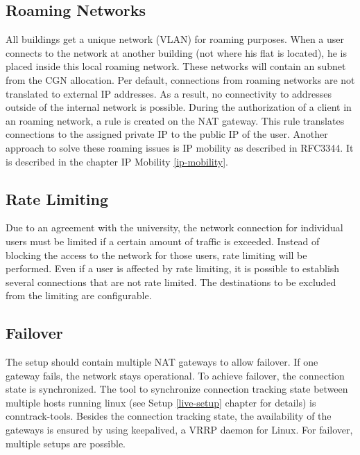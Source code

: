 \documentclass{report}
\begin{document}
\subsection{Roaming Networks}\label{roaming-networks}

All buildings get a unique network (VLAN) for roaming purposes. When a user connects to the network
at another building (not where his flat is located), he is placed inside
this local roaming network. These networks will contain an subnet from
the CGN allocation. Per default, connections from roaming networks are
not translated to external IP addresses. As a result, no connectivity to
addresses outside of the internal network is possible. During the
authorization of a client in an roaming network, a rule is created on
the NAT gateway. This rule translates connections to the assigned
private IP to the public IP of the user. Another approach to solve these
roaming issues is IP mobility as described in RFC3344\cite{IPMob}. It is described in the chapter IP Mobility \ref{ip-mobility}.



\subsection{Rate Limiting}\label{rate-limiting}

Due to an agreement with the university, the network connection for
individual users must be limited if a certain amount of traffic is
exceeded. Instead of blocking the access to the network for those users,
rate limiting will be performed. Even if a user is affected by rate
limiting, it is possible to establish several connections that
are not rate limited. The destinations to be excluded from the limiting
are configurable.

\subsection{Failover}\label{failover}

The setup should contain multiple NAT gateways to allow failover. If one
gateway fails, the network stays operational. To achieve failover,
the connection state is synchronized. The tool to synchronize
connection tracking state between multiple hosts running linux (see Setup \ref{live-setup} chapter for details) is
conntrack-tools\cite{conntrack-tools}. Besides the connection tracking state, the availability
of the gateways is ensured by using keepalived\cite{keepalived}, a VRRP daemon for Linux.
For failover, multiple setups are possible.
\end{document}
